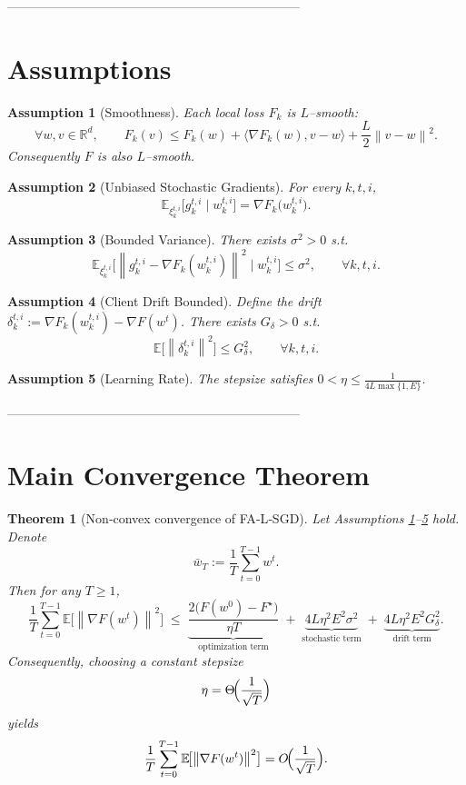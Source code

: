 \documentclass{article}
\newtheorem{assumption}{Assumption}
\newtheorem{theorem}{Theorem}
\newcommand{\EE}{\mathbb{E}}
\newcommand{\RR}{\mathbb{R}}
\newcommand{\norm}[1]{\left\|#1\right\|}
\begin{document}
---------------------------------------------------------------------

\section*{Assumptions}
\begin{assumption}[Smoothness]\label{as:smooth}
Each local loss $F_k$ is $L$–smooth:
\[
\forall w,v\in\RR^{d},\qquad
F_k(v)\le F_k(w)+\langle\nabla F_k(w),v-w\rangle+\frac{L}{2}\norm{v-w}^{2}.
\]
Consequently $F$ is also $L$–smooth.
\end{assumption}

\begin{assumption}[Unbiased Stochastic Gradients]\label{as:unbiased}
For every $k,t,i$,
\[
\EE_{\xi_{k}^{t,i}}\!\bigl[g_{k}^{t,i}\mid w_{k}^{t,i}\bigr]=\nabla F_k\!\bigl(w_{k}^{t,i}\bigr).
\]
\end{assumption}

\begin{assumption}[Bounded Variance]\label{as:var}
There exists $\sigma^{2}>0$ s.t.
\[
\EE_{\xi_{k}^{t,i}}\!\bigl[\norm{g_{k}^{t,i}-\nabla F_k(w_{k}^{t,i})}^{2}\mid w_{k}^{t,i}\bigr]
\le\sigma^{2},\qquad\forall k,t,i.
\]
\end{assumption}

\begin{assumption}[Client Drift Bounded]\label{as:drift}
Define the drift $\delta_{k}^{t,i}:=
\nabla F_k(w_{k}^{t,i})-\nabla F(w^{t})$.
There exists $G_{\delta}>0$ s.t.
\[
\EE\!\bigl[\norm{\delta_{k}^{t,i}}^{2}\bigr]\le G_{\delta}^{2},
\qquad\forall k,t,i.
\]
\end{assumption}

\begin{assumption}[Learning Rate]\label{as:lr}
The stepsize satisfies $0<\eta\le \frac{1}{4L\max\{1,E\}}$.
\end{assumption}

---------------------------------------------------------------------

\section*{Main Convergence Theorem}
\begin{theorem}[Non‑convex convergence of FA‑L‑SGD]\label{thm:main}
Let Assumptions \ref{as:smooth}–\ref{as:lr} hold.  Denote
\[
\bar w_T:=\frac1T\sum_{t=0}^{T-1} w^{t}.
\]
Then for any $T\ge1$,
\[
\frac1T\sum_{t=0}^{T-1}\EE\!\bigl[\norm{\nabla F(w^{t})}^{2}\bigr]
\;\le\;
\underbrace{\frac{2\bigl(F(w^{0})-F^{\star}\bigr)}{\eta T}}_{\text{optimization term}}
\;+\;
\underbrace{4L\eta^{2}E^{2}\sigma^{2}}_{\text{stochastic term}}
\;+\;
\underbrace{4L\eta^{2}E^{2}G_{\delta}^{2}}_{\text{drift term}}.
\]
Consequently, choosing a constant stepsize
\[
\eta = \Theta\!\Bigl(\frac{1}{\sqrt{T}}\Bigr)
\]
yields
\[
\frac1T\sum_{t=0}^{T-1}\EE\!\bigl[\norm{\nabla F(w^{t})}^{2}\bigr]
= O\!\Bigl(\frac{1}{\sqrt{T}}\Bigr).
\]
\end{theorem}
\end{document}
